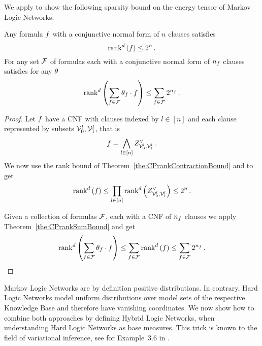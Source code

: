 We apply  to show the following sparsity bound on the energy tensor of Markov Logic Networks.

\begin{theorem}
	Any formula $f$ with a conjunctive normal form of $n$ clauses satisfies
		\[ \mathrm{rank}^{d}\left(f\right) \leq 2^{n} \, . \]
	For any set $\mathcal{F}$ of formulas each with a conjunctive normal form of $n_{f}$ clauses satisfies for any $\theta$
		\[ \mathrm{rank}^{d}\left(\sum_{f\in\mathcal{F}}\theta_{f}\cdot f\right) \leq \sum_{f\in\mathcal{F}}2^{n_{f}} \, . \]
\end{theorem}
\begin{proof}
	Let $f$ have a CNF with clauses indexed by $l\in[n]$ and each clause represented by subsets $\mathcal{V}_0^l, \mathcal{V}_1^l$, that is
		\[ f = \bigwedge_{l \in [n]}  Z^{\lor}_{\mathcal{V}_0^l,\mathcal{V}_1^l} \, . \]
	We now use the rank bound of Theorem~\ref{the:CPrankContractionBound} and  to get
	\begin{align*}
		\mathrm{rank}^{d}\left(f\right) \leq \prod_{l \in [n]}  \mathrm{rank}^{d}\left(Z^{\lor}_{\mathcal{V}_0^l,\mathcal{V}_1^l}\right) \leq 2^n \, . 
	\end{align*}
	
	Given a collection of formulas $\mathcal{F}$, each with a CNF of $n_{f}$ clauses we apply Theorem~\ref{the:CPrankSumBound} and get
	\begin{align*}
		\mathrm{rank}^{d}\left(\sum_{f\in\mathcal{F}}\theta_{f}\cdot f\right) \leq \sum_{f\in\mathcal{F}}\mathrm{rank}^{d}\left(f\right) \leq \sum_{f\in\mathcal{F}}2^{n_{f}} \, . 
	\end{align*}
\end{proof}






Markov Logic Networks are by definition positive distributions.
In contrary, Hard Logic Networks model uniform distributions over model sets of the respective Knowledge Base and therefore have vanishing coordinates.
We now show how to combine both approaches by defining Hybrid Logic Networks, when understanding Hard Logic Networks as base measures.
This trick is known to the field of variational inference, see for Example~3.6 in \cite{wainwright_graphical_2008}. 

